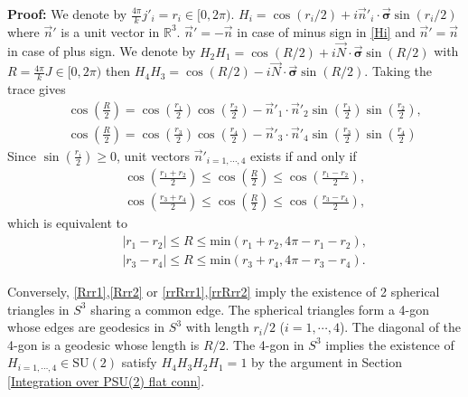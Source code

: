 \documentclass[aps,prd,notitlepage,nofootinbib,superscriptaddress,groupedaddress,twocolumn]{revtex4-1}
\def\R{\mathbb{R}}
\newcommand{\Su}{\mathrm{SU}(2)}
\def\be{\begin{eqnarray}}
\def\ee{\end{eqnarray}}
\newcommand{\sig}{\sigma}
\newcommand{\lt}{\left}
\newcommand{\rt}{\right}
\begin{document}
\textbf{Proof:} We denote by $\frac{4\pi }{k}j'_i=r_i\in[0,2\pi)$. $H_i=\cos(r_i/2)+ i\vec{n}'_i\cdot\vec{\mathbf{\sig}}\sin(r_i/2)$ where $\vec{n}'$ is a unit vector in $\R^3$. $\vec{n}'=-\vec{n}$ in case of minus sign in \eqref{Hi} and $\vec{n}'=\vec{n}$ in case of plus sign. We denote by $H_2H_1=\cos(R/2)+i\vec{N}\cdot\vec{\mathbf{\sig}}\sin(R/2)$ with $R=\frac{4\pi }{k}J\in [0,2\pi)$ then $H_4H_3=\cos(R/2)-i\vec{N}\cdot\vec{\mathbf{\sig}}\sin(R/2)$. Taking the trace gives
\be
&&\cos\lt(\frac{R}{2}\rt)=\cos\lt(\frac{r_1}{2}\rt)\cos\lt(\frac{r_2}{2}\rt)-\vec{n}'_1\cdot\vec{n}'_2\sin\lt(\frac{r_1}{2}\rt)\sin\lt(\frac{r_2}{2}\rt),\\
&&\cos\lt(\frac{R}{2}\rt)=\cos\lt(\frac{r_3}{2}\rt)\cos\lt(\frac{r_4}{2}\rt)-\vec{n}'_3\cdot\vec{n}'_4\sin\lt(\frac{r_3}{2}\rt)\sin\lt(\frac{r_4}{2}\rt)
\ee
Since $\sin\lt(\frac{r_i}{2}\rt)\geq 0$, unit vectors $\vec{n}'_{i=1,\cdots,4}$ exists if and only if
\be
&&\cos\lt(\frac{r_1+r_2}{2}\rt)\leq \cos\lt(\frac{R}{2}\rt)\leq \cos\lt(\frac{r_1-r_2}{2}\rt),\label{Rrr1}\\
&&\cos\lt(\frac{r_3+r_4}{2}\rt)\leq \cos\lt(\frac{R}{2}\rt)\leq \cos\lt(\frac{r_3-r_4}{2}\rt),\label{Rrr2}
\ee
which is equivalent to
\be
&&|r_1-r_2|\leq R\leq \mathrm{min}\lt(r_1+r_2,4\pi-r_1-r_2\rt),\label{rrRrr1}\\
	&&|r_3-r_4|\leq R\leq \mathrm{min}\lt(r_3+r_4,4\pi-r_3-r_4\rt).\label{rrRrr2}
\ee

Conversely, \eqref{Rrr1},\eqref{Rrr2} or \eqref{rrRrr1},\eqref{rrRrr2} imply the existence of 2 spherical triangles in $S^3$ sharing a common edge. The spherical triangles form a 4-gon whose edges are geodesics in $S^3$ with length $r_i/2$ ($i=1,\cdots,4$). The diagonal of the 4-gon is a geodesic whose length is $R/2$. The 4-gon in $S^3$ implies the existence of $H_{i=1,\cdots,4}\in\Su$ satisfy $H_4H_3H_2H_1=1$ by the argument in Section \ref{Integration over PSU(2) flat conn}.





\end{document}
